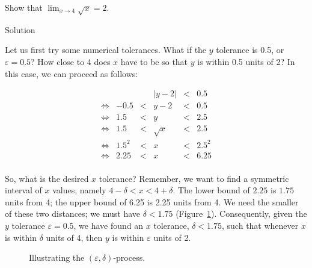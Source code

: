 \begin{example}\label {ex_compute_lim1}
Show that $\displaystyle \lim_{x\rightarrow 4} \sqrt{x} = 2 $.

\pagebreak
{}Solution 

\ifcalculus 
Let us first try some numerical tolerances.  What if the $y$ tolerance is 0.5, or $\varepsilon =0.5$?  How close to 4 does $x$ have to be so that $y$ is within 0.5 units of 2?  In this case, we can proceed as follows:

 \[ \begin{array}{rrcccl}
&&&|y-2|& < & 0.5\\
\Leftrightarrow&-0.5 &<& y-2 &<& 0.5 \\
\Leftrightarrow&1.5 &<& y &<& 2.5 \\
\Leftrightarrow&1.5 &<& \sqrt{x} &<& 2.5 \\
\Leftrightarrow&1.5^2 &<& x &<& 2.5^2 \\
\Leftrightarrow&2.25 &<& x &<& 6.25 \\\end{array}\]

So, what is the desired $x$ tolerance?  Remember, we want to find a symmetric interval of $x$ values, namely
$4 - \delta < x < 4 + \delta$.  The lower bound of $2.25$ is $1.75$ units from 4; the upper bound of 6.25 is 2.25 units from 4. We need the smaller of these two distances; we must have $\delta < 1.75$ (Figure~\ref{fig_lim_8}). Consequently, given the $y$ tolerance $\varepsilon =0.5$, we have found an $x$ tolerance, $\delta < 1.75$, such that whenever $x$ is within $\delta$ units of 4, then $y$ is within $\varepsilon$ units of 2.  

\begin{figure}[H]
\centering
\centerline{
\qquad
{}
}
\caption{Illustrating the $(\varepsilon,\delta)$-process. }
\label{fig_lim_8}
\end{figure}



\end{example}
